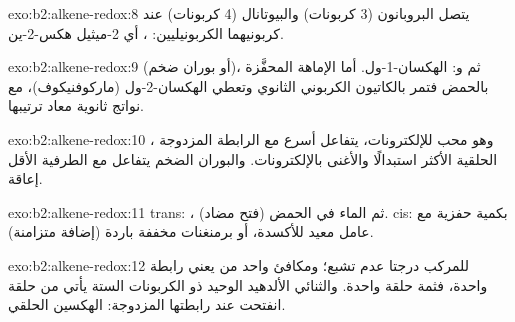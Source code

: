 \begin{solution}{exo:b2:alkene-redox:8}
يتصل البروبانون (3 كربونات) والبيوتانال (4 كربونات) عند كربونيهما الكربونيليين: ،
أي 2-ميثيل هكس-2-ين.
\end{solution}

\begin{solution}{exo:b2:alkene-redox:9}
 (أو بوران ضخم)، ثم  و: الهكسان-1-ول. أما الإماهة المحفَّزة بالحمض
فتمر بالكاتيون الكربوني الثانوي وتعطي الهكسان-2-ول (ماركوفنيكوف)، مع
نواتج ثانوية معاد ترتيبها.
\end{solution}

\begin{solution}{exo:b2:alkene-redox:10}
، وهو محب للإلكترونات، يتفاعل أسرع مع الرابطة المزدوجة الحلقية الأكثر استبدالًا والأغنى
بالإلكترونات. والبوران الضخم يتفاعل مع  الطرفية الأقل إعاقة.
\end{solution}

\begin{solution}{exo:b2:alkene-redox:11}
trans: ، ثم الماء في الحمض (فتح مضاد). cis:  بكمية حفزية مع
عامل معيد للأكسدة، أو برمنغنات مخففة باردة (إضافة متزامنة).
\end{solution}

\begin{solution}{exo:b2:alkene-redox:12}
للمركب  درجتا عدم تشبع؛ ومكافئ واحد من  يعني رابطة  واحدة، فثمة
حلقة واحدة. والثنائي الألدهيد الوحيد ذو الكربونات الستة يأتي من حلقة انفتحت عند رابطتها المزدوجة:
الهكسين الحلقي.
\end{solution}

